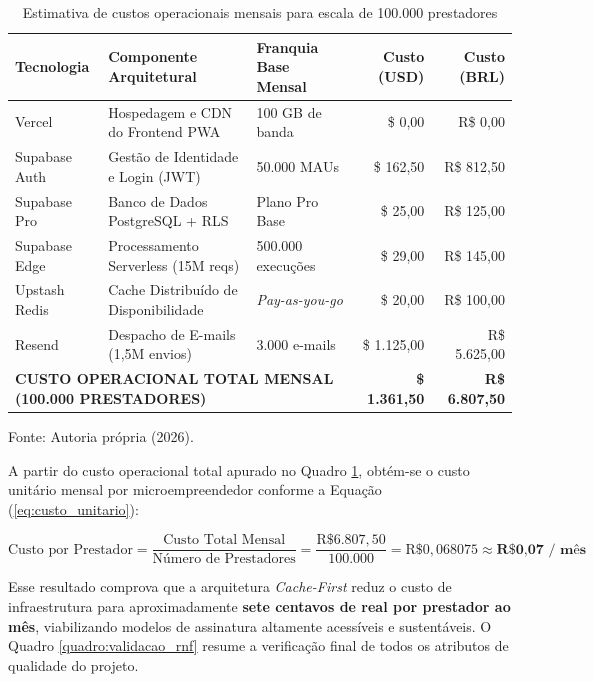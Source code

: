 \documentclass[12pt,a4paper]{article}
\begin{document}
\begin{table}[hbt]
\centering
\caption{Estimativa de custos operacionais mensais para escala de 100.000 prestadores}
\label{quadro:custos_escala}
\footnotesize
\renewcommand{\arraystretch}{1.2}
\begin{tabularx}{\textwidth}{|l|X|l|r|r|}
\hline
\textbf{Tecnologia} & \textbf{Componente Arquitetural} & \textbf{Franquia Base Mensal} & \textbf{Custo (USD)} & \textbf{Custo (BRL)} \\ \hline
Vercel & Hospedagem e CDN do Frontend PWA & 100 GB de banda & \$ 0,00 & R\$ 0,00 \\ \hline
Supabase Auth & Gestão de Identidade e Login (JWT) & 50.000 MAUs & \$ 162,50 & R\$ 812,50 \\ \hline
Supabase Pro & Banco de Dados PostgreSQL + RLS & Plano Pro Base & \$ 25,00 & R\$ 125,00 \\ \hline
Supabase Edge & Processamento Serverless (15M reqs) & 500.000 execuções & \$ 29,00 & R\$ 145,00 \\ \hline
Upstash Redis & Cache Distribuído de Disponibilidade & \textit{Pay-as-you-go} & \$ 20,00 & R\$ 100,00 \\ \hline
Resend & Despacho de E-mails (1,5M envios) & 3.000 e-mails & \$ 1.125,00 & R\$ 5.625,00 \\ \hline
\multicolumn{3}{|l|}{\textbf{CUSTO OPERACIONAL TOTAL MENSAL (100.000 PRESTADORES)}} & \textbf{\$ 1.361,50} & \textbf{R\$ 6.807,50} \\ \hline
\end{tabularx}
\vspace{0.1cm}
{\footnotesize Fonte: Autoria própria (2026).}
\end{table}

A partir do custo operacional total apurado no Quadro \ref{quadro:custos_escala}, obtém-se o custo unitário mensal por microempreendedor conforme a Equação (\ref{eq:custo_unitario}):

\begin{equation}
\text{Custo por Prestador} = \frac{\text{Custo Total Mensal}}{\text{Número de Prestadores}} = \frac{\text{R\$ } 6.807{,}50}{100.000} = \text{R\$ } 0{,}068075 \approx \textbf{R\$ 0,07 / mês}
\label{eq:custo_unitario}
\end{equation}

Esse resultado comprova que a arquitetura \textit{Cache-First} reduz o custo de infraestrutura para aproximadamente \textbf{sete centavos de real por prestador ao mês}, viabilizando modelos de assinatura altamente acessíveis e sustentáveis. O Quadro \ref{quadro:validacao_rnf} resume a verificação final de todos os atributos de qualidade do projeto.
\end{document}
